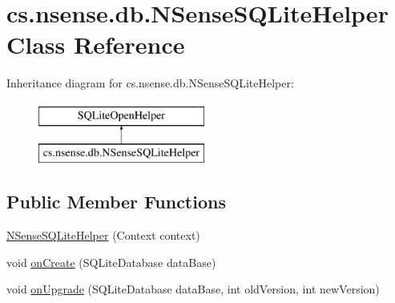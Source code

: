 \hypertarget{classcs_1_1nsense_1_1db_1_1_n_sense_s_q_lite_helper}{\section{cs.\-nsense.\-db.\-N\-Sense\-S\-Q\-Lite\-Helper Class Reference}
\label{classcs_1_1nsense_1_1db_1_1_n_sense_s_q_lite_helper}
}
Inheritance diagram for cs.\-nsense.\-db.\-N\-Sense\-S\-Q\-Lite\-Helper\-:\begin{figure}[H]
\begin{center}
\leavevmode
\includegraphics[height=2.000000cm]{classcs_1_1nsense_1_1db_1_1_n_sense_s_q_lite_helper}
\end{center}
\end{figure}
\subsection*{Public Member Functions}
\begin{DoxyCompactItemize}
\item 
\hyperlink{classcs_1_1nsense_1_1db_1_1_n_sense_s_q_lite_helper_a6a2a173b4c5e1b1e33b1d36a380b886d}{N\-Sense\-S\-Q\-Lite\-Helper} (Context context)
\item 
void \hyperlink{classcs_1_1nsense_1_1db_1_1_n_sense_s_q_lite_helper_ac4c38c27fba0abfa951c5c4736ae4dc2}{on\-Create} (S\-Q\-Lite\-Database data\-Base)
\item 
void \hyperlink{classcs_1_1nsense_1_1db_1_1_n_sense_s_q_lite_helper_ae5355b2d853b945bc089ad666f8a89ff}{on\-Upgrade} (S\-Q\-Lite\-Database data\-Base, int old\-Version, int new\-Version)
\end{DoxyCompactItemize}

